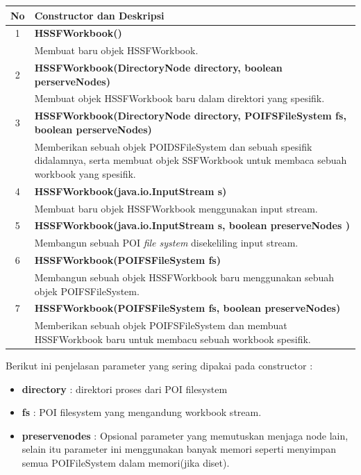 	\begin{tabular}{|c|p{12cm}|}
		\hline
		\textbf{No} & \textbf{Constructor dan Deskripsi} \\ \hline \hline
		1 & \textbf{HSSFWorkbook()}\\
			&	Membuat baru objek HSSFWorkbook.\\ \hline 
		2 & \textbf{HSSFWorkbook(DirectoryNode directory, boolean perserveNodes)}\\
			&	Membuat objek HSSFWorkbook baru dalam direktori yang spesifik.\\ \hline
		3 & \textbf{HSSFWorkbook(DirectoryNode directory, POIFSFileSystem fs, boolean perserveNodes)}\\
			&	Memberikan sebuah objek POIDSFileSystem dan sebuah spesifik didalamnya, serta membuat objek SSFWorkbook untuk membaca sebuah workbook yang spesifik.\\ \hline 
		4 & \textbf{HSSFWorkbook(java.io.InputStream s)}\\
			&	Membuat baru objek HSSFWorkbook menggunakan input stream.\\ \hline
		5 & \textbf{HSSFWorkbook(java.io.InputStream s, boolean preserveNodes )}\\
			&	Membangun sebuah POI \textit{file system} disekeliling input stream.\\ \hline
		6 & \textbf{HSSFWorkbook(POIFSFileSystem fs)}\\
			&	Membangun sebuah objek HSSFWorkbook baru menggunakan sebuah objek POIFSFileSystem.\\ \hline 		
		7 & \textbf{HSSFWorkbook(POIFSFileSystem fs, boolean preserveNodes)}\\
			&	Memberikan sebuah objek POIFSFileSystem dan membuat HSSFWorkbook baru untuk membacu sebuah workbook spesifik.\\ \hline 
	\end{tabular}

Berikut ini penjelasan parameter yang sering dipakai pada constructor :
\begin{itemize}
	\item \textbf{directory} : direktori proses dari POI filesystem
	\item \textbf{fs} : POI filesystem yang mengandung workbook stream.
	\item \textbf{preservenodes} : Opsional parameter yang memutuskan menjaga node lain, selain itu parameter ini menggunakan banyak memori seperti menyimpan semua POIFileSystem dalam memori(jika diset).
\end{itemize} 

